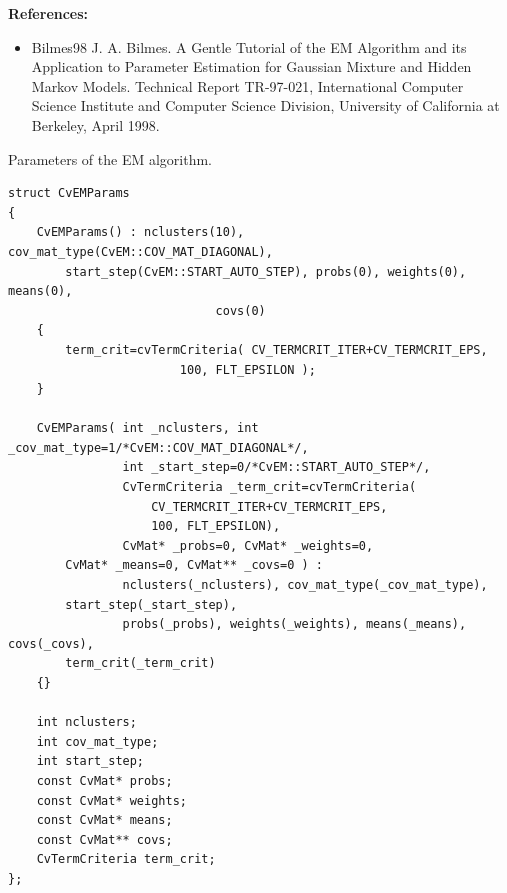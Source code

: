 \textbf{References:}
\begin{itemize}
\item Bilmes98 J. A. Bilmes. A Gentle Tutorial of the EM Algorithm and its Application to Parameter Estimation for Gaussian Mixture and Hidden Markov Models. Technical Report TR-97-021, International Computer Science Institute and Computer Science Division, University of California at Berkeley, April 1998.
\end{itemize}


Parameters of the EM algorithm.

\begin{lstlisting}
struct CvEMParams
{
    CvEMParams() : nclusters(10), cov_mat_type(CvEM::COV_MAT_DIAGONAL),
        start_step(CvEM::START_AUTO_STEP), probs(0), weights(0), means(0), 
						     covs(0)
    {
        term_crit=cvTermCriteria( CV_TERMCRIT_ITER+CV_TERMCRIT_EPS, 
						100, FLT_EPSILON );
    }

    CvEMParams( int _nclusters, int _cov_mat_type=1/*CvEM::COV_MAT_DIAGONAL*/,
                int _start_step=0/*CvEM::START_AUTO_STEP*/,
                CvTermCriteria _term_crit=cvTermCriteria(
					CV_TERMCRIT_ITER+CV_TERMCRIT_EPS, 
					100, FLT_EPSILON),
                CvMat* _probs=0, CvMat* _weights=0, 
		CvMat* _means=0, CvMat** _covs=0 ) :
                nclusters(_nclusters), cov_mat_type(_cov_mat_type), 
		start_step(_start_step),
                probs(_probs), weights(_weights), means(_means), covs(_covs), 
		term_crit(_term_crit)
    {}

    int nclusters;
    int cov_mat_type;
    int start_step;
    const CvMat* probs;
    const CvMat* weights;
    const CvMat* means;
    const CvMat** covs;
    CvTermCriteria term_crit;
};
\end{lstlisting}

